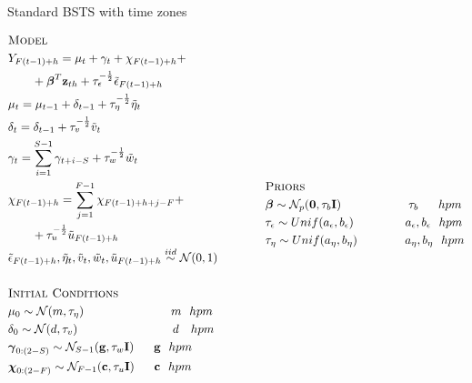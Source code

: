 \documentclass{beamer}
\begin{document}
\begin{frame}{Standard BSTS with time zones}
\tiny

 	\begin{equation*}
\begin{aligned}
&\textsc{Model}\\
&Y_{F(t-1)+h} =
\mu_{t} + \gamma_{t} + \chi_{F(t-1)+h} +\\&\quad\quad+ \boldsymbol{\beta}^T\mathbf{z}_{th} + \tau_\epsilon^{-\frac{1}{2}}\tilde{\epsilon}_{F(t-1)+h}\\
&\mu_t = \mu_{t-1} + \delta_{t-1} +\tau_\eta^{-\frac{1}{2}}\tilde{\eta}_t\\
&\delta_t = \delta_{t-1} + \tau_v^{-\frac{1}{2}}\tilde{v}_t\\
&\gamma_t = \sum_{i=1}^{S-1}\gamma_{t+i-S} + \tau_w^{-\frac{1}{2}}\tilde{w}_t\\
&\chi_{F(t-1)+h} = \sum_{j=1}^{F-1}\chi_{F(t-1)+h+j-F} +\\&\quad\quad+ \tau_u^{-\frac{1}{2}}\tilde{u}_{F(t-1)+h}\\
&\tilde{\epsilon}_{F(t-1)+h}, \tilde{\eta}_t, \tilde{v}_t, \tilde{w}_t, \tilde{u}_{F(t-1)+h} \overset{iid}{\sim} \mathcal{N}(0,1)\\
\\
&\textsc{Initial Conditions}\\
&\mu_0 \sim \mathcal{N}(m, \tau_\eta)\quad \quad\quad\quad \quad \quad \quad\  m\ \ hpm\\
&\delta_0 \sim \mathcal{N}(d, \tau_v)\quad \quad\quad\quad \quad \quad \quad \quad d\ \ \ hpm\\
&\boldsymbol{\gamma}_{0:(2-S)} \sim \mathcal{N}_{S-1}(\mathbf{g}, \tau_w\mathbf{I})\quad\ \ \mathbf{g}\ \ hpm\\
&\boldsymbol{\chi}_{0:(2-F)} \sim \mathcal{N}_{F-1}(\mathbf{c}, \tau_u\mathbf{I})\quad\ \  \mathbf{c}\ \ hpm\\
\\
\end{aligned}
\qquad \qquad
\begin{aligned}[c]
&\textsc{Priors}\\
&\boldsymbol{\beta} \sim \mathcal{N}_p(\mathbf{0}, \tau_b \mathbf{I})\ \ \quad \quad \quad \quad \quad \tau_b\ \quad \ hpm\\
&\tau_\epsilon \sim Unif(a_\epsilon, b_\epsilon)\quad\quad\ \quad \quad a_\epsilon, b_\epsilon\ \ hpm\\
&\tau_\eta \sim Unif(a_\eta, b_\eta)\quad\quad\quad \quad a_\eta, b_\eta\ \ hpm\\

\end{aligned}
\end{equation*}
\end{frame}
\end{document}
